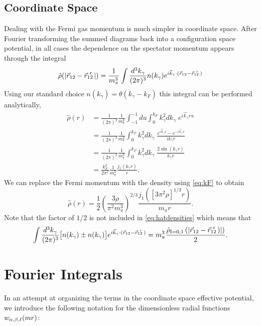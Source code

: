 \section{\label{app:rhohat}Coordinate Space}

Dealing with the Fermi gas momentum is much simpler in coordinate space. After Fourier transforming the summed diagrams back into a configuration space potential, in all cases the dependence on the spectator momentum appears through the integral
\begin{equation}
\hat{\rho}(|\vec{r}_{12}-\vec{r}_{12}\!\!\!'\,\,|) = \frac{1}{m_\pi^3}\int \frac{d^3k_\gamma}{(2\pi)^3}n(k_\gamma)e^{i\vec{k}_\gamma \cdot(\vec{r}_{12}-\vec{r}_{12}\!\!\!'\,\,)}
\end{equation}
Using our standard choice $n(k_\gamma)=\theta(k_\gamma-k_F)$ this integral can be performed analytically,
\begin{equation}\begin{split}
\hat{\rho}(r) &= \frac{1}{(2\pi)^2}\frac{1}{m_\pi^3}\int_{-1}^{-1}du \int_0^{k_F} k_\gamma^2dk_\gamma \;e^{i \vec{k}_\gamma r u} \\
&= \frac{1}{(2\pi)^2}\frac{1}{m_\pi^3} \int_0^{k_F} k_\gamma^2 dk_\gamma \;\frac{e^{i\vec{k}_\gamma r}-e^{-i\vec{k}_\gamma r}}{ik_\gamma r} \\
&= \frac{1}{(2\pi)^2}\frac{1}{m_\pi^3} \int_0^{k_F} k_\gamma^2 dk_\gamma \;\frac{2 \sin(k_\gamma r)}{k_\gamma r} \\
&= \frac{k_F^2}{2\pi^2}\frac{1}{m_\pi^3} \frac{j_1(k_\gamma r)}{r}.
\end{split}
\end{equation}
We can replace the Fermi momentum with the density using \eqref{eq:kF} to obtain
\begin{equation}
\hat{\rho}(r) = \frac{1}{2}\left(\frac{3\rho}{\pi^2 m_\pi^3}\right)^{2/3} \frac{j_1( [3\pi^2\rho]^{1/3} r)}{m_\pi r}.
\end{equation}
Note that the factor of $1/2$ is not included in \eqref{eq:hatdensities} which means that
\begin{equation}
\int \frac{d^3k_\gamma}{(2\pi)^3}\big[ n(k_\gamma)\pm n(k_\gamma)\big]e^{i\vec{k}_\gamma \cdot(\vec{r}_{12}-\vec{r}_{12}\!\!\!'\,\,)} =m_\pi^3 \frac{ \hat{\rho}_{\text{I}=0,1}\left( |\vec{r}_{12}-\vec{r}_{12}\!\!\!'\,\,)| \right)}{2}.
\end{equation}

\chapter{\label{app:wNotation}Fourier Integrals}

In an attempt at organizing the terms in the coordinate space effective potential, we introduce the following notation for the dimensionless radial functions $w_{\alpha,\beta,\ell}( m r )$:

